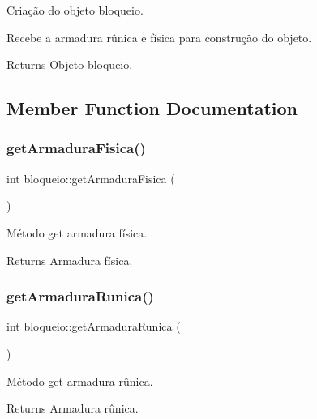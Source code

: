 Criação do objeto bloqueio. 

Recebe a armadura rûnica e física para construção do objeto. \begin{DoxyReturn}{Returns}
Objeto bloqueio. 
\end{DoxyReturn}


\subsection{Member Function Documentation}
\mbox{\label{classbloqueio_a7bdccc95284f88b2c30fe9b35bc26a2b}} 
\subsubsection{\texorpdfstring{get\+Armadura\+Fisica()}{getArmaduraFisica()}}
{\footnotesize\ttfamily int bloqueio\+::get\+Armadura\+Fisica (\begin{DoxyParamCaption}{ }\end{DoxyParamCaption})}



Método get armadura física. 

\begin{DoxyReturn}{Returns}
Armadura física. 
\end{DoxyReturn}
\mbox{\label{classbloqueio_a1d06f5be69ab5f74f983fe7de1efe41c}} 
\subsubsection{\texorpdfstring{get\+Armadura\+Runica()}{getArmaduraRunica()}}
{\footnotesize\ttfamily int bloqueio\+::get\+Armadura\+Runica (\begin{DoxyParamCaption}{ }\end{DoxyParamCaption})}



Método get armadura rûnica. 

\begin{DoxyReturn}{Returns}
Armadura rûnica. 
\end{DoxyReturn}
\mbox{\label{classbloqueio_ab47b5ba74cd295c9998ba042773d9814}} 
